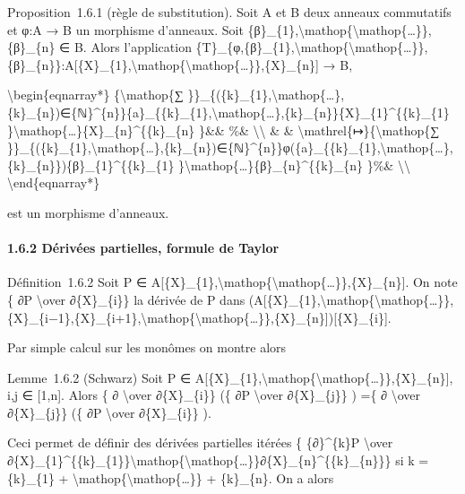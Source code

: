 \documentclass[]{article}
\begin{document}
Proposition~1.6.1 (règle de substitution). Soit A et B deux anneaux
commutatifs et φ:A → B un morphisme d'anneaux. Soit
\{β\}\_\{1\},\textbackslash{}mathop\{\textbackslash{}mathop\{\ldots{}\}\},\{β\}\_\{n\}
∈ B. Alors l'application
\{T\}\_\{φ,\{β\}\_\{1\},\textbackslash{}mathop\{\textbackslash{}mathop\{\ldots{}\}\},\{β\}\_\{n\}\}:A{[}\{X\}\_\{1\},\textbackslash{}mathop\{\textbackslash{}mathop\{\ldots{}\}\},\{X\}\_\{n\}{]}
→ B,

\textbackslash{}begin\{eqnarray*\} \{\textbackslash{}mathop\{∑
\}\}\_\{(\{k\}\_\{1\},\textbackslash{}mathop\{\ldots{}\},\{k\}\_\{n\})∈\{ℕ\}\^{}\{n\}\}\{a\}\_\{\{k\}\_\{1\},\textbackslash{}mathop\{\ldots{}\},\{k\}\_\{n\}\}\{X\}\_\{1\}\^{}\{\{k\}\_\{1\}
\}\textbackslash{}mathop\{\ldots{}\}\{X\}\_\{n\}\^{}\{\{k\}\_\{n\}
\}\&\& \%\& \textbackslash{}\textbackslash{} \& \&
\textbackslash{}mathrel\{↦\}\{\textbackslash{}mathop\{∑
\}\}\_\{(\{k\}\_\{1\},\textbackslash{}mathop\{\ldots{}\},\{k\}\_\{n\})∈\{ℕ\}\^{}\{n\}\}φ(\{a\}\_\{\{k\}\_\{1\},\textbackslash{}mathop\{\ldots{}\},\{k\}\_\{n\}\})\{β\}\_\{1\}\^{}\{\{k\}\_\{1\}
\}\textbackslash{}mathop\{\ldots{}\}\{β\}\_\{n\}\^{}\{\{k\}\_\{n\}
\}\%\& \textbackslash{}\textbackslash{} \textbackslash{}end\{eqnarray*\}

est un morphisme d'anneaux.

\paragraph{1.6.2 Dérivées partielles, formule de Taylor}

Définition~1.6.2 Soit P ∈
A{[}\{X\}\_\{1\},\textbackslash{}mathop\{\textbackslash{}mathop\{\ldots{}\}\},\{X\}\_\{n\}{]}.
On note \{ ∂P \textbackslash{}over ∂\{X\}\_\{i\}\} la dérivée de P dans
(A{[}\{X\}\_\{1\},\textbackslash{}mathop\{\textbackslash{}mathop\{\ldots{}\}\},\{X\}\_\{i−1\},\{X\}\_\{i+1\},\textbackslash{}mathop\{\textbackslash{}mathop\{\ldots{}\}\},\{X\}\_\{n\}{]}){[}\{X\}\_\{i\}{]}.

Par simple calcul sur les monômes on montre alors

Lemme~1.6.2 (Schwarz) Soit P ∈
A{[}\{X\}\_\{1\},\textbackslash{}mathop\{\textbackslash{}mathop\{\ldots{}\}\},\{X\}\_\{n\}{]},
i,j ∈ {[}1,n{]}. Alors \{ ∂ \textbackslash{}over ∂\{X\}\_\{i\}\} (\{ ∂P
\textbackslash{}over ∂\{X\}\_\{j\}\} ) =\{ ∂ \textbackslash{}over
∂\{X\}\_\{j\}\} (\{ ∂P \textbackslash{}over ∂\{X\}\_\{i\}\} ).

Ceci permet de définir des dérivées partielles itérées \{
\{∂\}\^{}\{k\}P \textbackslash{}over
∂\{X\}\_\{1\}\^{}\{\{k\}\_\{1\}\}\textbackslash{}mathop\{\textbackslash{}mathop\{\ldots{}\}\}∂\{X\}\_\{n\}\^{}\{\{k\}\_\{n\}\}\}
si k = \{k\}\_\{1\} +
\textbackslash{}mathop\{\textbackslash{}mathop\{\ldots{}\}\} +
\{k\}\_\{n\}. On a alors
\end{document}
